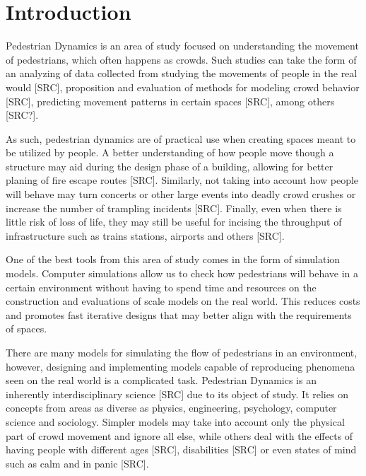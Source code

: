 \documentclass[twoside, 11pt]{article}
\begin{document}
 



\mainmatter

\section{Introduction}

Pedestrian Dynamics is an area of study focused on understanding the movement of pedestrians, which often happens as crowds. Such studies can take the form of an analyzing of data collected from studying the movements of people in the real would [SRC], proposition and evaluation of methods for modeling crowd behavior [SRC], predicting movement patterns in certain spaces [SRC], among others [SRC?].

As such, pedestrian dynamics are of practical use when creating spaces meant to be utilized by people. A better understanding of how people move though a structure may aid during the design phase of a building, allowing for better planing of fire escape routes [SRC]. Similarly, not taking into account how people will behave may turn concerts or other large events into deadly crowd crushes or increase the number of trampling incidents [SRC]. Finally, even when there is little risk of loss of life, they may still be useful for incising the throughput of infrastructure such as trains stations, airports and others [SRC].

One of the best tools from this area of study comes in the form of simulation models. Computer simulations allow us to check how pedestrians will behave in a certain environment without having to spend time and resources on the construction and evaluations of scale models on the real world. This reduces costs and promotes fast iterative designs that may better align with the requirements of spaces.

There are many models for simulating the flow of pedestrians in an environment, however, designing and implementing models capable of reproducing phenomena seen on the real world is a complicated task. Pedestrian Dynamics is an inherently interdisciplinary science [SRC] due to its object of study. It relies on concepts from areas as diverse as physics, engineering, psychology, computer science and sociology. Simpler models may take into account only the physical part of crowd movement and ignore all else, while others deal with the effects of having people with different ages [SRC], disabilities [SRC] or even states of mind such as calm and in panic [SRC].
\end{document}
